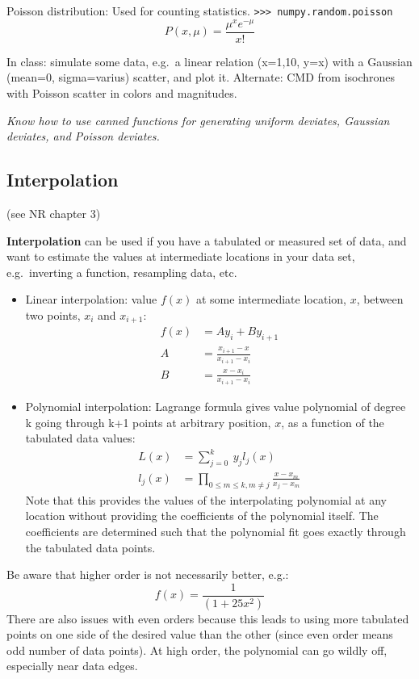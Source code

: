 \documentclass[12pt]{article}
\begin{document}
Poisson distribution:
Used for counting statistics.
\texttt{>>> numpy.random.poisson}
\begin{equation*}
    P(x,\mu) = \frac{\mu^xe^{-\mu}}{x!}
\end{equation*}

In class: simulate some data, e.g.\ a linear relation (x=1,10, y=x) with a
Gaussian (mean=0, sigma=varius) scatter, and plot it. Alternate: CMD from
isochrones with Poisson scatter in colors and magnitudes. \\

\colorbox{hl}{\parbox{0.9\textwidth}
{\emph{Know how to use canned functions for generating uniform deviates,
Gaussian deviates, and Poisson deviates.}}}

\subsection{Interpolation}
(see NR chapter 3)

\textbf{Interpolation} can be used if you have a tabulated or measured set of
data, and want to estimate the values at intermediate locations in your data
set, e.g.\ inverting a function, resampling data, etc.
\begin{itemize}
    \item Linear interpolation: value $f(x)$ at some intermediate location,
        $x$, between two points, $x_i$ and $x_{i+1}$:
        \begin{align*}
            f(x) &= Ay_i + By_{i+1} \\
            A &= \frac{x_{i+1}-x}{x_{i+1}-x_i} \\
            B &= \frac{x-x_i}{x_{i+1}-x_i}
        \end{align*}
    \item Polynomial interpolation: Lagrange formula gives value polynomial
        of degree k going through k+1 points at arbitrary position, $x$, as
        a function of the tabulated data values:
        \begin{align*}
            L(x) &= \sum ^k_{j=0} \ y_j l_j (x) \\
            l_j(x) &= \prod _{0 \leq m \leq k, m \ne j}
            \frac{x-x_m}{x_j - x_m}
        \end{align*}
        Note that this provides the values of the interpolating polynomial at
        any location without providing the coefficients of the polynomial itself.
        The coefficients are determined such that the polynomial fit goes exactly
        through the tabulated data points.
\end{itemize}
Be aware that higher order is not necessarily better, e.g.:
$$ f(x) = \frac{1}{(1+25x^2)} $$
There are also issues with even orders because this leads to using more tabulated
points on one side of the desired value than the other (since even order means odd
number of data points). At high order, the polynomial can go wildly off, especially
near data edges.
\end{document}
